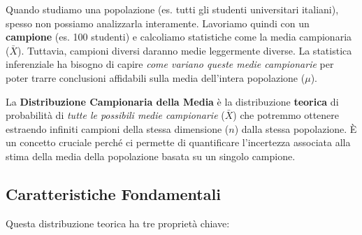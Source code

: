 \documentclass[12pt, a4paper]{article}
\newcommand{\popmean}{\mu} %
\newcommand{\samplemean}{\bar{X}} %
\begin{document}
Quando studiamo una popolazione (es. tutti gli studenti universitari italiani), spesso non possiamo analizzarla interamente. Lavoriamo quindi con un \textbf{campione} (es. 100 studenti) e calcoliamo statistiche come la media campionaria ($\samplemean$). Tuttavia, campioni diversi daranno medie leggermente diverse. La statistica inferenziale ha bisogno di capire \textit{come variano queste medie campionarie} per poter trarre conclusioni affidabili sulla media dell'intera popolazione ($\popmean$).

La \textbf{Distribuzione Campionaria della Media} è la distribuzione \textbf{teorica} di probabilità di \textit{tutte le possibili medie campionarie} ($\samplemean$) che potremmo ottenere estraendo infiniti campioni della stessa dimensione ($n$) dalla stessa popolazione. È un concetto cruciale perché ci permette di quantificare l'incertezza associata alla stima della media della popolazione basata su un singolo campione.

\subsection*{Caratteristiche Fondamentali}

Questa distribuzione teorica ha tre proprietà chiave:
\end{document}

